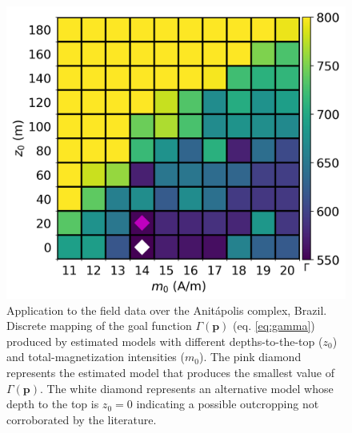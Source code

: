 \begin{figure}
	\centering
	\includegraphics[scale=.75]{figures/real_gamma.png}
	\caption{Application to the field data over the Anit{\'a}polis complex, Brazil. 
	Discrete mapping of the goal function $\Gamma(\mathbf{p})$ (eq. \ref{eq:gamma})  
	produced by estimated models with different depths-to-the-top ($ z_0 $) and 
	total-magnetization intensities ($ m_0 $).
	The pink diamond represents the estimated model that produces the smallest value of $ \Gamma(\mathbf{p})$.
	The white diamond represents an alternative model whose depth to the top is $z_0=0$ indicating a possible outcropping not corroborated by the literature.}
	\label{fig:real_map}
\end{figure}

